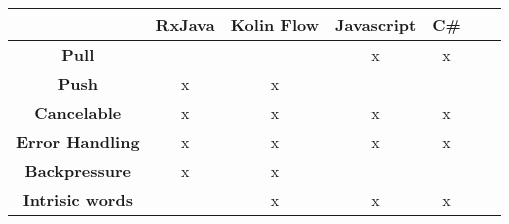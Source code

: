 \begin{table}[!htbp]
	\begin{tabular}{|c|c|c|c|c|c|c|}
	\hline
										  & \textbf{RxJava} & \textbf{Kolin Flow} & \multicolumn{1}{l|}{\textbf{Javascript}} & \multicolumn{1}{l|}{\textbf{C\#}} \\ \hline
	\textbf{Pull}                         &               &              & x                                        & x   		   								\\ \hline
	\textbf{Push}                   	  & x             & x             &                                         &    	  								 \\ \hline
	\textbf{Cancelable}     			  & x             & x             & x                                       & x          								 \\ \hline
	\textbf{Error Handling} 			  & x             & x             & x                                       & x   		   									\\ \hline
	\textbf{Backpressure} 			      & x             & x             &                                         &      									   \\ \hline
	\textbf{Intrisic words} 			  &               & x             & x                                       & x      									     \\ \hline
	\end{tabular}
\end{table}